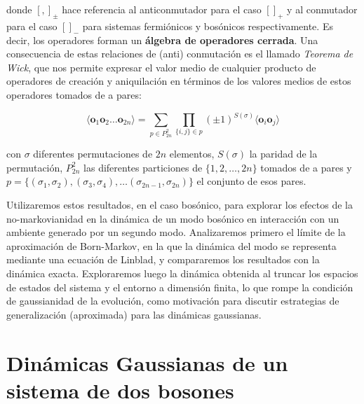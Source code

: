 \documentclass{report} %
\numberwithin{equation}{section}
\begin{document}
donde $[,]_{\pm}$ hace referencia al anticonmutador para el caso $[]_+$ y al conmutador para el caso $[]_-$ para sistemas fermiónicos y bosónicos respectivamente. Es decir, los operadores forman un \textbf{álgebra de operadores cerrada}. Una consecuencia de estas relaciones de (anti) conmutación es el llamado \emph{Teorema de Wick}, que nos permite expresar el valor medio de cualquier producto de operadores de creación y aniquilación en términos de los valores medios de estos operadores tomados de a pares:

$$
\langle \mathbf{o}_1 \mathbf{o}_2\ldots \mathbf{o}_{2n} \rangle = \sum_{p\in P_{2n}^2} \prod_{\{i,j\}\in p} (\pm 1)^{S(\sigma)}
 \langle \mathbf{o}_{i} \mathbf{o}_{j} \rangle 
$$

con $\sigma$ diferentes permutaciones de $2n$ elementos, $S(\sigma)$ la paridad de la permutación, ${P}_{2n}^2$ las diferentes particiones de $\{1,2,\ldots, 2n\}$ tomados de a pares y $p=\{(\sigma_1,\sigma_2),(\sigma_3,\sigma_4),\ldots (\sigma_{2n-1},\sigma_{2n})\}$ el conjunto de esos pares. 
    
Utilizaremos estos resultados, en el caso bosónico, para explorar los efectos de la no-markovianidad en la dinámica de un modo bosónico en interacción con un ambiente generado por un segundo modo. Analizaremos primero el límite de la aproximación de Born-Markov, en la que la dinámica del modo se representa mediante una ecuación de Linblad, y compararemos los resultados con la dinámica exacta. Exploraremos luego la dinámica obtenida al truncar los espacios de estados del sistema y el entorno a dimensión finita, lo que rompe la condición de gaussianidad de la evolución, como motivación para discutir estrategias de generalización (aproximada) para las dinámicas gaussianas. 



\chapter{Din\'amicas Gaussianas de un sistema de dos bosones}\label{cap3_dosbosones}
\end{document}
